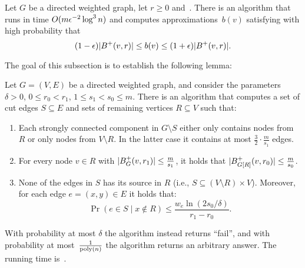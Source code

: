 \documentclass[letterpaper,11pt]{article}
\begin{document}
\begin{lemma} \label{lem:cohen}
Let $G$ be a directed weighted graph, let $r \geq 0$ and~. There is an algorithm that runs in time $O(m \epsilon^{-2} \log^3 n)$ and computes approximations~$b(v)$ satisfying with high probability that
\begin{equation*}
    (1 - \epsilon) |B^+(v, r)| \leq b(v) \leq (1 + \epsilon) |B^+(v, r)|.
\end{equation*}
\end{lemma}

The goal of this subsection is to establish the following lemma:

\begin{lemma} \label{lem:cut-light}
Let $G = (V, E)$ be a directed weighted graph, and consider the parameters $\delta > 0$, $0 \leq r_0 < r_1$, $1 \leq s_1 < s_0 \leq m$. There is an algorithm that computes a set of cut edges $S \subseteq E$ and sets of remaining vertices $R \subseteq V$ such that:
\begin{enumerate}[label=(\roman*)]
    \item Each strongly connected component in $G \setminus S$ either only contains nodes from $R$ or only nodes from $V \setminus R$. In the latter case it contains at most $\frac32 \cdot \frac{m}{s_1}$ edges.
    \item For every node $v \in R$ with $|B^+_G(v, r_1)| \leq \frac{m}{s_1}$, it holds that $|B^+_{G[R]}(v, r_0)| \leq \frac{m}{s_0}$.
    \item None of the edges in $S$ has its source in $R$ (i.e., $S \subseteq (V \setminus R) \times V$). Moreover, for each edge $e = (x, y) \in E$ it holds that:
    \begin{equation*}
        \Pr(e \in S \mid x \not\in R) \leq \frac{w_e \ln(2s_0 / \delta)}{r_1 - r_0}.
    \end{equation*}
\end{enumerate}
With probability at most $\delta$ the algorithm instead returns ``fail'', and with probability at most~$\frac{1}{\operatorname{\text{{\rm poly}}}(n)}$ the algorithm returns an arbitrary answer. The running time is~.
\end{lemma}
\end{document}
